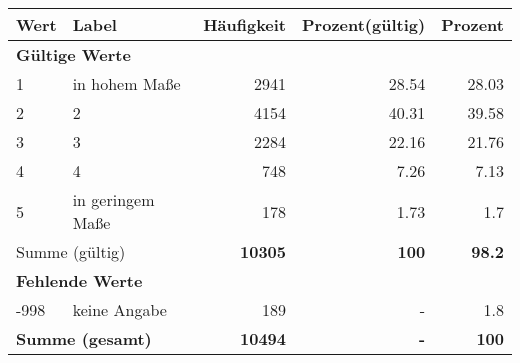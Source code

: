      \begin{longtable}{lXrrr}
     \toprule
     \textbf{Wert} & \textbf{Label} & \textbf{Häufigkeit} & \textbf{Prozent(gültig)} & \textbf{Prozent} \\
     \endhead
     \midrule
     \multicolumn{5}{l}{\textbf{Gültige Werte}}\\

     1 &
     \multicolumn{1}{X}{ in hohem Maße   } &


       \num{2941} &
       \num[round-mode=places,round-precision=2]{28,54} &
         \num[round-mode=places,round-precision=2]{28,03} \\

     2 &
     \multicolumn{1}{X}{ 2   } &


       \num{4154} &
       \num[round-mode=places,round-precision=2]{40,31} &
         \num[round-mode=places,round-precision=2]{39,58} \\

     3 &
     \multicolumn{1}{X}{ 3   } &


       \num{2284} &
       \num[round-mode=places,round-precision=2]{22,16} &
         \num[round-mode=places,round-precision=2]{21,76} \\

     4 &
     \multicolumn{1}{X}{ 4   } &


       \num{748} &
       \num[round-mode=places,round-precision=2]{7,26} &
         \num[round-mode=places,round-precision=2]{7,13} \\

     5 &
     \multicolumn{1}{X}{ in geringem Maße   } &


       \num{178} &
       \num[round-mode=places,round-precision=2]{1,73} &
         \num[round-mode=places,round-precision=2]{1,7} \\
     \midrule
     \multicolumn{2}{l}{Summe (gültig)} &
       \textbf{\num{10305}} &
     \textbf{100} &
       \textbf{\num[round-mode=places,round-precision=2]{98,2}} \\
     \multicolumn{5}{l}{\textbf{Fehlende Werte}}\\
       -998 &
       keine Angabe &
         \num{189} &
        - &
         \num[round-mode=places,round-precision=2]{1,8} \\
     \midrule
     \multicolumn{2}{l}{\textbf{Summe (gesamt)}} &
          \textbf{\num{10494}} &
        \textbf{-} &
        \textbf{100} \\
     \bottomrule
     \end{longtable}
     

